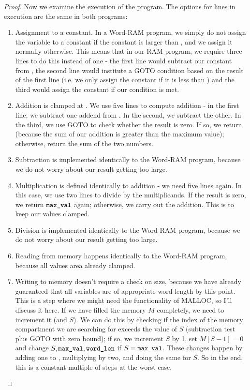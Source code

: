 \documentclass[11pt]{article}
\begin{document}
\begin{enumerate}
\begin{proof}
Now we examine the execution of the program. The options for lines in execution are the same in both programs:

\begin{enumerate}
\item Assignment to a constant. In a Word-RAM program, we simply do not assign the variable to a constant if the constant is larger than \maxval, and we assign it normally otherwise. This means that in our RAM program, we require three lines to do this instead of one - the first line would subtract our constant from \maxval, the second line would institute a GOTO condition based on the result of the first line (i.e. we only assign the constant if it is less than \maxval) and the third would assign the constant if our condition is met.

\item Addition is clamped at \maxval. We use five lines to compute addition - in the first line, we subtract one addend from \maxval. In the second, we subtract the other. In the third, we use GOTO to check whether the result is zero. If so, we return \maxval (because the sum of our addition is greater than the maximum value); otherwise, return the sum of the two numbers.

\item Subtraction is implemented identically to the Word-RAM program, because we do not worry about our result getting too large.

\item Multiplication is defined identically to addition - we need five lines again. In this case, we use two lines to divide \maxval by the multiplicands. If the result is zero, we return $\texttt{max\_val}$ again; otherwise, we carry out the addition. This is to keep our values clamped.

\item Division is implemented identically to the Word-RAM program, because we do not worry about our result getting too large.

\item Reading from memory happens identically to the Word-RAM program, because all values area already clamped.

\item Writing to memory doesn't require a check on size, because we have already guaranteed that all variables are of appropriate word length by this point. This is a step where we might need the functionality of MALLOC, so I'll discuss it here. If we have filled the memory $M$ completely, we need to increment it (and $S$). We can do this by checking if the index of the memory compartment we are searching for exceeds the value of $S$ (subtraction test plus GOTO with zero bound); if so, we increment $S$ by 1, set $M[S - 1] = 0$ and change $S, \texttt{max\_val}, \texttt{word\_len}$ if $S = \texttt{max\_val}$. These changes happen by adding one to \wordlen, multiplying \maxval by two, and doing the same for $S$. So in the end, this is a constant multiple of steps at the worst case.


\end{enumerate}
\end{proof}
\end{enumerate}
\end{document}

